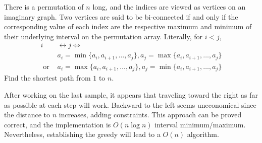 \documentclass[../../main]{subfiles}
\begin{document}

There is a permutation of $n$ long, and the indices are viewed as vertices on 
an imaginary graph. Two vertices are said to be bi-connected if and only if the
corresponding value of each index are the respective maximum and minimum of their 
underlying interval on the permutation array. Literally, for $i < j$, 
\begin{align*}
    i &\leftrightarrow j \iff \\
    &a_i = \min\{a_i, a_{i+1}, \ldots, a_j\}, a_j = \max\{a_i, a_{i+1}, \ldots, a_j\} \\
    \text{ or } &a_i = \max\{a_i, a_{i+1}, \ldots, a_j\}, a_j = \min\{a_i, a_{i+1}, \ldots, a_j\}
\end{align*}
Find the shortest path from $1$ to $n$.


After working on the last sample, it appears that traveling toward the right 
as far as possible at each step will work. Backward to the left seems uneconomical 
since the distance to $n$ increases, adding constraints. This approach can be proved correct, 
and the implementation is $O(n\log n)$ interval minimum/maximum. 
Nevertheless, establishing the greedy will lead to a $O(n)$ algorithm. 
\end{document}
